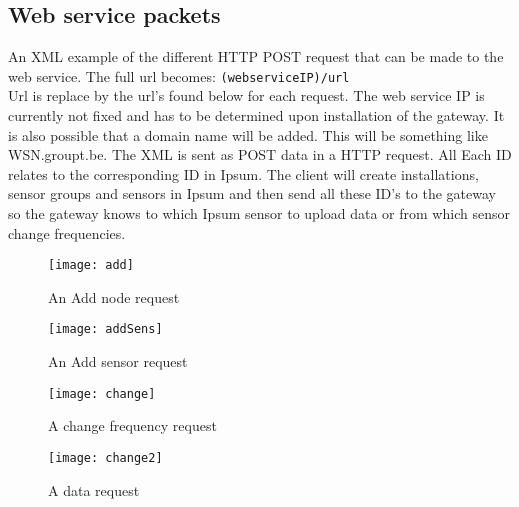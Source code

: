 \subsection{Web service packets}
\label{xml}
An XML example of the different HTTP POST request that can be made to the web service. The full url becomes: \verb+(webserviceIP)/url+\\
Url is replace by the url’s found below for each request. The web service IP is currently not fixed and has to be determined upon installation of the gateway. It is also possible that a domain name will be added. This will be something like WSN.groupt.be. The XML is sent as POST data in a HTTP request. All Each ID relates to the corresponding ID in Ipsum. The client will create installations, sensor groups and sensors in Ipsum and then send all these ID’s to the gateway so the gateway knows to which Ipsum sensor to upload data or from which sensor change frequencies.\\
\begin{figure}[htbp]
\centering
\texttt{[image: add]}
\caption{An Add node request}
\end{figure}

\begin{figure}[htbp]
\centering
\texttt{[image: addSens]}
\caption{An Add sensor request}
\end{figure}

\begin{figure}[htbp]
\centering
\texttt{[image: change]}
\caption{A change frequency request}
\end{figure}

\begin{figure}[htbp]
\centering
\texttt{[image: change2]}
\caption{A data request}
\end{figure}